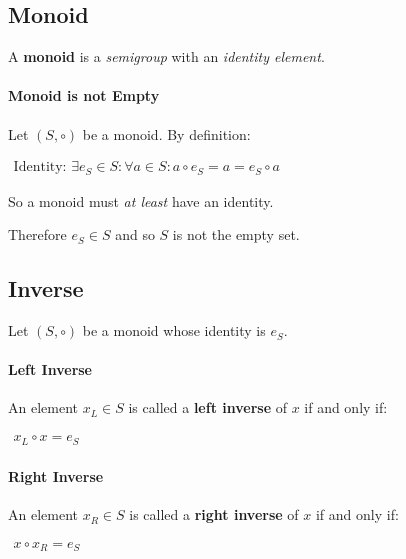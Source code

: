 \subsection{Monoid}
\label{sec:monoid}

A \textbf{monoid} is a \textit{semigroup} with an \textit{identity
  element}.

\paragraph{Monoid is not Empty}

Let $(S, \circ)$ be a monoid. By definition:

\begin{math}
  \begin{array}{c}
    \text{Identity: } \exists e_S \in S : \forall a \in S: a \circ e_S = a = e_S \circ a
  \end{array}
\end{math}

So a monoid must \textit{at least} have an identity.

Therefore $e_S \in S $ and so $S$ is not the empty set.


\subsection{Inverse}
\label{sec:inverse}

Let $(S, \circ)$ be a monoid whose identity is $e_S$.

\paragraph{Left Inverse}
An element $x_L \in S$ is called a \textbf{left inverse} of $x$ if and
only if:

\begin{math}
  \begin{array}{c}
    x_L \circ x = e_S
  \end{array}
\end{math}


\paragraph{Right Inverse}
An element $x_R \in S$ is called a \textbf{right inverse} of $x$ if and
only if:

\begin{math}
  \begin{array}{c}
    x \circ x_R = e_S
  \end{array}
\end{math}

